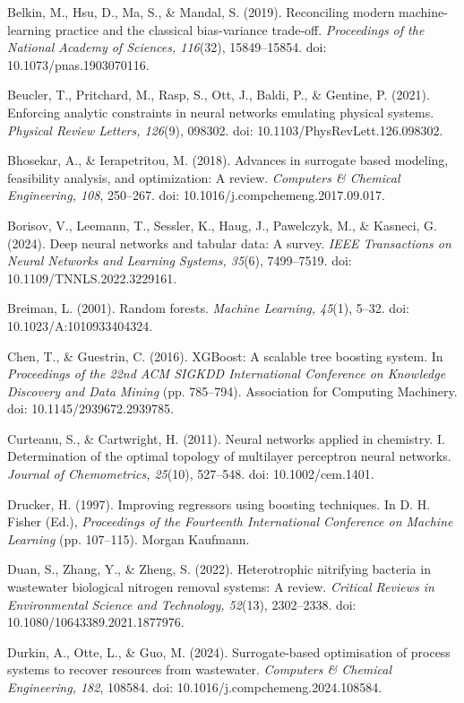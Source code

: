 \documentclass[a4paper,fleqn]{cas-sc}
\begin{document}
\noindent Belkin, M., Hsu, D., Ma, S., \& Mandal, S. (2019). Reconciling modern machine-learning practice and the classical bias-variance trade-off. \textit{Proceedings of the National Academy of Sciences, 116}(32), 15849--15854. doi: 10.1073/pnas.1903070116.

\noindent Beucler, T., Pritchard, M., Rasp, S., Ott, J., Baldi, P., \& Gentine, P. (2021). Enforcing analytic constraints in neural networks emulating physical systems. \textit{Physical Review Letters, 126}(9), 098302. doi: 10.1103/PhysRevLett.126.098302.

\noindent Bhosekar, A., \& Ierapetritou, M. (2018). Advances in surrogate based modeling, feasibility analysis, and optimization: A review. \textit{Computers \& Chemical Engineering, 108}, 250--267. doi: 10.1016/j.compchemeng.2017.09.017.

\noindent Borisov, V., Leemann, T., Sessler, K., Haug, J., Pawelczyk, M., \& Kasneci, G. (2024). Deep neural networks and tabular data: A survey. \textit{IEEE Transactions on Neural Networks and Learning Systems, 35}(6), 7499--7519. doi: 10.1109/TNNLS.2022.3229161.

\noindent Breiman, L. (2001). Random forests. \textit{Machine Learning, 45}(1), 5--32. doi: 10.1023/A:1010933404324.

\noindent Chen, T., \& Guestrin, C. (2016). XGBoost: A scalable tree boosting system. In \textit{Proceedings of the 22nd ACM SIGKDD International Conference on Knowledge Discovery and Data Mining} (pp. 785--794). Association for Computing Machinery. doi: 10.1145/2939672.2939785.

\noindent Curteanu, S., \& Cartwright, H. (2011). Neural networks applied in chemistry. I. Determination of the optimal topology of multilayer perceptron neural networks. \textit{Journal of Chemometrics, 25}(10), 527--548. doi: 10.1002/cem.1401.

\noindent Drucker, H. (1997). Improving regressors using boosting techniques. In D. H. Fisher (Ed.), \textit{Proceedings of the Fourteenth International Conference on Machine Learning} (pp. 107--115). Morgan Kaufmann.

\noindent Duan, S., Zhang, Y., \& Zheng, S. (2022). Heterotrophic nitrifying bacteria in wastewater biological nitrogen removal systems: A review. \textit{Critical Reviews in Environmental Science and Technology, 52}(13), 2302--2338. doi: 10.1080/10643389.2021.1877976.

\noindent Durkin, A., Otte, L., \& Guo, M. (2024). Surrogate-based optimisation of process systems to recover resources from wastewater. \textit{Computers \& Chemical Engineering, 182}, 108584. doi: 10.1016/j.compchemeng.2024.108584.
\end{document}
